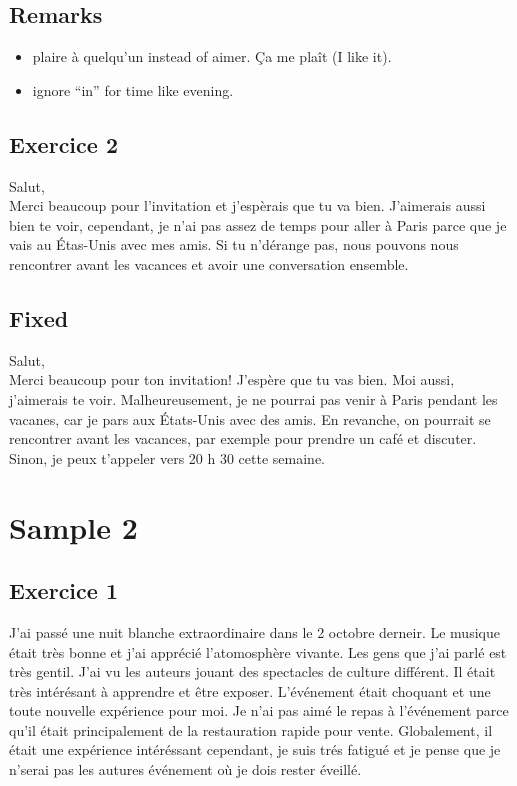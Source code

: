 \documentclass{book}
\begin{document}
        \subsection*{Remarks}
            \begin{itemize}
                \item plaire à quelqu'un instead of aimer. Ça me plaît (I like it).
                \item ignore ``in'' for time like evening.
            \end{itemize}
        
        \newpage
        \subsection{Exercice 2}
            Salut, \\
            Merci beaucoup pour l'invitation et j'espèrais que tu va bien. 
            J'aimerais aussi bien te voir, cependant, je n'ai pas assez de temps pour aller à Paris parce que je vais au Étas-Unis avec mes amis.
            Si tu n'dérange pas, nous pouvons nous rencontrer avant les vacances et avoir une conversation ensemble.

        \subsection*{Fixed}
            Salut, \\
            Merci beaucoup pour ton invitation! J'espère que tu vas bien. Moi aussi, j'aimerais te voir.
            Malheureusement, je ne pourrai pas venir à Paris pendant les vacanes, car je pars aux États-Unis avec des amis. 
            En revanche, on pourrait se rencontrer avant les vacances, par exemple pour prendre un café et discuter. Sinon, je peux t'appeler vers 20 h 30 cette semaine.
    \newpage
    \section{Sample 2}
        
        \subsection{Exercice 1}
            J'ai passé une nuit blanche extraordinaire dans le 2 octobre derneir. Le musique était très bonne et j'ai apprécié l'atomosphère vivante.
            Les gens que j'ai parlé est très gentil. J'ai vu les auteurs jouant des spectacles de culture différent. 
            Il était très intérésant à apprendre et être exposer. L'événement était choquant et une toute nouvelle expérience pour moi.
            Je n'ai pas aimé le repas à l'événement parce qu'il était principalement de la restauration rapide pour vente.
            Globalement, il était une expérience intéréssant cependant, je suis trés fatigué et je pense que je n'serai pas les autures événement où je dois rester éveillé.
\end{document}
